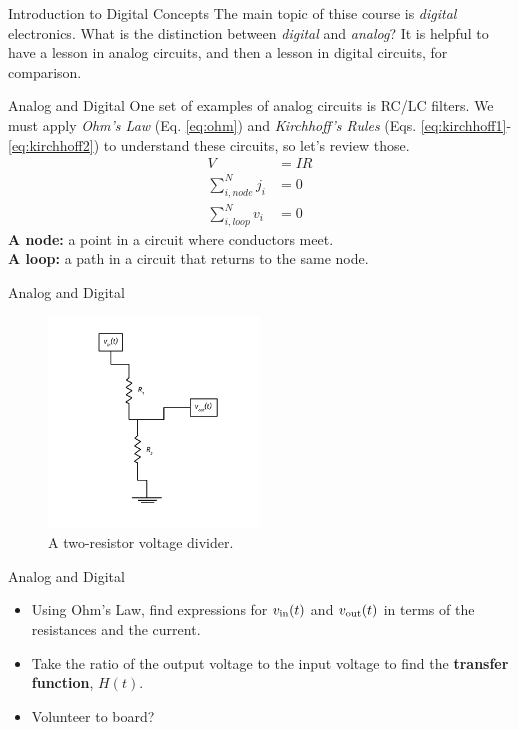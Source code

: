 \documentclass{beamer}
\begin{document}
\begin{frame}{Introduction to Digital Concepts}
The main topic of thise course is \alert{\textit{digital}} electronics.  What is the distinction between \alert{\textit{digital}} and \alert{\textit{analog}}?  It is helpful to have a lesson in analog circuits, and then a lesson in digital circuits, for comparison.
\end{frame}

\begin{frame}{Analog and Digital}
One set of examples of analog circuits is RC/LC filters.  We must apply \textit{Ohm's Law} (Eq. \ref{eq:ohm}) and \textit{Kirchhoff's Rules} (Eqs. \ref{eq:kirchhoff1}-\ref{eq:kirchhoff2}) to understand these circuits, so let's review those.
\begin{align}
V &= IR \label{eq:ohm} \\
\sum_{i,node}^N j_i &= 0 \label{eq:kirchhoff1} \\
\sum_{i,loop}^N v_{i} &= 0 \label{eq:kirchhoff2}
\end{align}
\textbf{A node:} a point in a circuit where conductors meet.\\
\textbf{A loop:} a path in a circuit that returns to the same node.
\end{frame}

\begin{frame}{Analog and Digital}
\begin{figure}
\centering
\includegraphics[width=0.5\textwidth]{AnalogExample/VoltageDivider.pdf}
\caption{\label{fig:example1} A two-resistor voltage divider.}
\end{figure}
\end{frame}

\begin{frame}{Analog and Digital}
\begin{itemize}
\item Using Ohm's Law, find expressions for $v_{\rm in}(t)$ and $v_{\rm out}(t)$ in terms of the resistances and the current.
\item Take the ratio of the output voltage to the input voltage to find the \textbf{transfer function}, $H(t)$.
\item Volunteer to board?
\end{itemize}
\end{frame}
\end{document}
